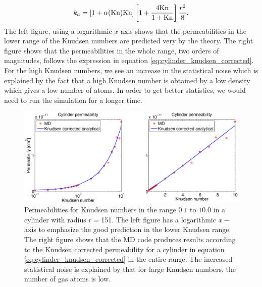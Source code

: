 \begin{align}
	\label{eq:cylinder_knudsen_corrected}
	k_a = [1 + \alpha(\text{Kn})\text{Kn}]\left[1 + {4\text{Kn}\over 1 + \text{Kn}}\right] {r^2\over 8}.
\end{align}
The left figure, using a logarithmic $x$-axis shows that the permeabilities in the lower range of the Knudsen numbers are predicted very by the theory. The right figure shows that the permeabilities in the whole range, two orders of magnitudes, follows the expression in equation \eqref{eq:cylinder_knudsen_corrected}. For the high Knudsen numbers, we see an increase in the statistical noise which is explained by the fact that a high Knudsen number is obtained by a low density which gives a low number of atoms. In order to get better statistics, we would need to run the simulation for a longer time.
\begin{figure}[h]
\begin{center}
\includegraphics[width=1.0\textwidth, trim=0cm 0cm 0cm 0cm, clip]{MD/figures/permeability_cylinder.eps}
\end{center}
\caption{Permeabilities for Knudsen numbers in the range $0.1$ to $10.0$ in a cylinder with radius $r=$\unit{151}{\angstrom}. The left figure has a logarithmic $x-$axis to emphasize the good prediction in the lower Knudsen range. The right figure shows that the MD code produces results according to the Knudsen corrected permeability for a cylinder in equation \eqref{eq:cylinder_knudsen_corrected} in the entire range. The increased statistical noise is explained by that for large Knudsen numbers, the number of gas atoms is low.}
\label{fig:md_permeability}
\end{figure}